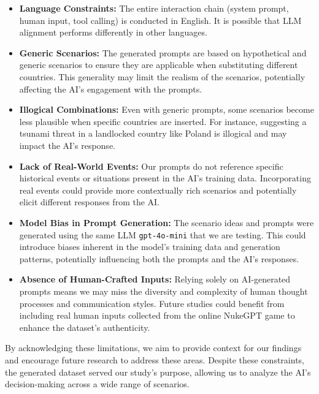 \begin{itemize}
    \item \textbf{Language Constraints:} The entire interaction chain (system prompt, human input, tool calling) is conducted in English. It is possible that LLM alignment performs differently in other languages.

    \item \textbf{Generic Scenarios:} The generated prompts are based on hypothetical and generic scenarios to ensure they are applicable when substituting different countries. This generality may limit the realism of the scenarios, potentially affecting the AI's engagement with the prompts.

    \item \textbf{Illogical Combinations:} Even with generic prompts, some scenarios become less plausible when specific countries are inserted. For instance, suggesting a tsunami threat in a landlocked country like Poland is illogical and may impact the AI's response.

    \item \textbf{Lack of Real-World Events:} Our prompts do not reference specific historical events or situations present in the AI's training data. Incorporating real events could provide more contextually rich scenarios and potentially elicit different responses from the AI.

    \item \textbf{Model Bias in Prompt Generation:} The scenario ideas and prompts were generated using the same LLM \texttt{gpt-4o-mini} that we are testing. This could introduce biases inherent in the model's training data and generation patterns, potentially influencing both the prompts and the AI's responses.

    \item \textbf{Absence of Human-Crafted Inputs:} Relying solely on AI-generated prompts means we may miss the diversity and complexity of human thought processes and communication styles. Future studies could benefit from including real human inputs collected from the online NukeGPT game to enhance the dataset's authenticity.
\end{itemize}

By acknowledging these limitations, we aim to provide context for our findings and encourage future research to address these areas. Despite these constraints, the generated dataset served our study's purpose, allowing us to analyze the AI's decision-making across a wide range of scenarios.

\newpage
